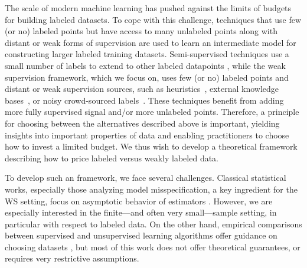 The scale of modern machine learning has pushed against the limits of budgets for building labeled datasets. To cope with this challenge, techniques that use few (or no) labeled points but have access to many unlabeled points along with distant or weak forms of supervision are used to learn an intermediate model for constructing larger labeled training datasets. Semi-supervised techniques \cite{zhu2009introduction} use a small number of labels to extend to other labeled datapoints \cite{Zhu02,Mann07,Wang08}, while the weak supervision framework, which we focus on, uses  few (or no) labeled points and distant or weak supervision sources, such as heuristics~\cite{gupta2014improved,ratner2018snorkel},  external knowledge bases~\cite{mintz2009distant,craven:ismb99,takamatsu:acl12}, or noisy crowd-sourced labels~\cite{karger2011iterative,dawid1979maximum}.
%
These techniques benefit from adding more fully supervised signal and/or more unlabeled points. Therefore, a principle for choosing between the alternatives described above is important, yielding insights into important properties of data and enabling practitioners to choose how to invest a limited budget. We thus wish to develop a theoretical framework describing how to price labeled versus weakly labeled data. %

To develop such an framework, we face several challenges. Classical statistical works, especially those analyzing model misspecification, a key ingredient for the WS setting, focus on asymptotic behavior of estimators \cite{kleijn2006, kleijn2012}. However, we are especially interested in the finite---and often very small---sample setting, in particular with respect to labeled data. On the other hand, empirical comparisons between supervised and unsupervised learning algorithms offer guidance on choosing datasets \cite{A,B,C}, but most of this work does not offer theoretical guarantees, or requires very restrictive assumptions. 

